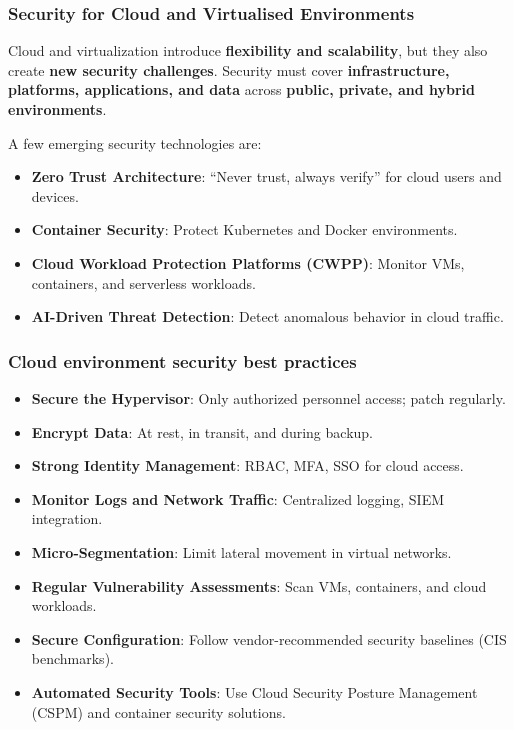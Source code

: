 \subsubsection{Security for Cloud and Virtualised Environments}

\indent 

Cloud and virtualization introduce \textbf{flexibility and scalability}, but they also create \textbf{new security challenges}. Security must cover \textbf{infrastructure, platforms, applications, and data} across \textbf{public, private, and hybrid environments}.

A few emerging security technologies are:

\begin{itemize}
    \item \textbf{Zero Trust Architecture}: “Never trust, always verify” for cloud users and devices.
    \item \textbf{Container Security}: Protect Kubernetes and Docker environments.
    \item \textbf{Cloud Workload Protection Platforms (CWPP)}: Monitor VMs, containers, and serverless workloads.
    \item \textbf{AI-Driven Threat Detection}: Detect anomalous behavior in cloud traffic.
\end{itemize}

\subsubsection{Cloud environment security best practices}

\begin{itemize}
    \item \textbf{Secure the Hypervisor}: Only authorized personnel access; patch regularly.
    \item \textbf{Encrypt Data}: At rest, in transit, and during backup.
    \item \textbf{Strong Identity Management}: RBAC, MFA, SSO for cloud access.
    \item \textbf{Monitor Logs and Network Traffic}: Centralized logging, SIEM integration.
    \item \textbf{Micro-Segmentation}: Limit lateral movement in virtual networks.
    \item \textbf{Regular Vulnerability Assessments}: Scan VMs, containers, and cloud workloads.
    \item \textbf{Secure Configuration}: Follow vendor-recommended security baselines (CIS benchmarks).
    \item \textbf{Automated Security Tools}: Use Cloud Security Posture Management (CSPM) and container security solutions.
\end{itemize}

